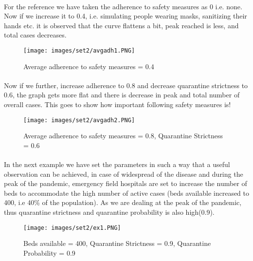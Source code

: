 \documentclass[12pt, a4paper]{extarticle}
\begin{document}
    \vspace{0.2in}
    \newpage
    \paragraph{} For the reference we have taken the adherence to safety measures as 0 i.e. none. Now if we increase it to 0.4, i.e. simulating people wearing masks, sanitizing their hands etc. it is observed that the curve flattens a bit, peak reached is less, and total cases decreases.
    \vspace{0.2in}
    \begin{figure}[h]
        \centering
        \texttt{[image: images/set2/avgadh1.PNG]}
        \caption{Average adherence to safety measures = 0.4}
    \end{figure}
    
    \vspace{0.2in}
    \newpage
    \paragraph{} Now if we further, increase adherence to 0.8 and decrease quarantine strictness to 0.6, the graph gets more flat and there is decrease in peak and total number of overall cases. This goes to show how important following safety measures is!
    \vspace{0.2in}
    \begin{figure}[h]
        \centering
        \texttt{[image: images/set2/avgadh2.PNG]}
        \caption{Average adherence to safety measures = 0.8, Quarantine Strictness = 0.6}
    \end{figure}
    
    \newpage
    \paragraph{} In the next example we have set the parameters in such a way that a useful observation can be achieved, in case of widespread of the disease and during the peak of the pandemic, emergency field hospitals are set to increase the number of beds to accommodate the high number of active cases (beds available increased to 400, i.e 40\% of the population). As we are dealing at the peak of the pandemic, thus quarantine strictness and quarantine probability is also high(0.9).
    \vspace{0.2in}
    \begin{figure}[h]
        \centering
        \texttt{[image: images/set2/ex1.PNG]}
        \caption{Beds available = 400, Quarantine Strictness = 0.9, Quarantine Probability = 0.9}
    \end{figure}
\end{document}
